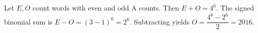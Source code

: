 Let $E,O$ count words with even and odd A counts. Then $E+O=4^6$. The signed binomial sum is $E-O=(3-1)^6=2^6$. Subtracting yields $O=\dfrac{4^6-2^6}{2}=\boxed{2016}$.
